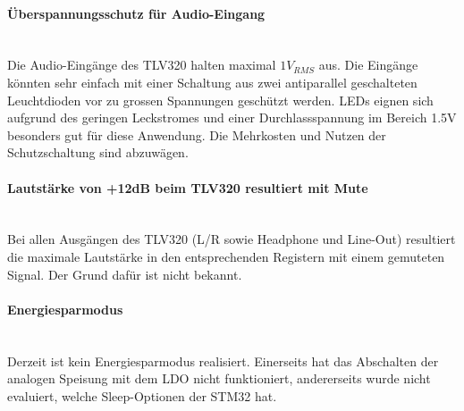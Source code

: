 \paragraph{Überspannungsschutz für Audio-Eingang}\vspace{-0.3cm}\\
Die Audio-Eingänge des TLV320 halten maximal $1\si{V_{RMS}}$ aus. Die Eingänge könnten sehr einfach mit einer Schaltung aus zwei antiparallel geschalteten Leuchtdioden vor zu grossen Spannungen geschützt werden. LEDs eignen sich aufgrund des geringen Leckstromes und einer Durchlassspannung im Bereich 1.5V besonders gut für diese Anwendung.
Die Mehrkosten und Nutzen der Schutzschaltung sind abzuwägen.
\\
\paragraph{Lautstärke von +12dB beim TLV320 resultiert mit Mute}\vspace{-0.3cm}\\
Bei allen Ausgängen des TLV320 (L/R sowie Headphone und Line-Out) resultiert die maximale Lautstärke in den entsprechenden Registern mit einem gemuteten Signal.
Der Grund dafür ist nicht bekannt.
\\
\paragraph{Energiesparmodus}\vspace{-0.3cm}\\
Derzeit ist kein Energiesparmodus realisiert. Einerseits hat das Abschalten der analogen Speisung mit dem LDO nicht funktioniert, andererseits wurde nicht evaluiert, welche Sleep-Optionen der STM32 hat.




